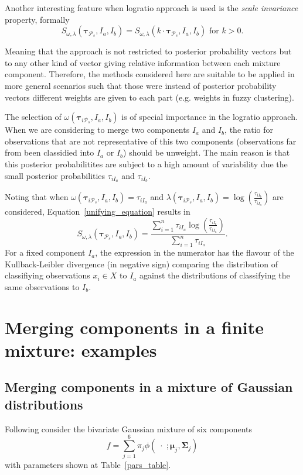 \documentclass[submit]{smj}
\theoremstyle{definition}
\newcommand{\m}[1]{\boldsymbol{#1}}
\begin{document}
Another interesting feature when logratio approach is used is the \emph{scale invariance} property, formally
\[
S_{\omega, \lambda}( \m\tau_{\mathcal{P}_s},  I_a,  I_b) = S_{\omega, \lambda}(k\cdot \m\tau_{\mathcal{P}_s},  I_a,  I_b) \text{ for $k>0$.}
\] 

Meaning that the approach is not restricted to posterior probability vectors but to any other kind of vector giving relative information between each mixture component. Therefore, the methods considered here are suitable to be applied in more general scenarios such that those were instead of posterior probability vectors different weights are given to each part (e.g. weights in fuzzy clustering).

The selection of $\omega(\m\tau_{i \mathcal{P}_s},  I_a,  I_b)$ is of special importance in the logratio approach. When we are considering to merge two components $I_a$ and $I_b$, the ratio for observations that are not representative of this two components (observations far from been classidied into $I_a$ or $I_b$) should be unweight. The main reason is that this posterior probabilitites are subject to a high amount of variability due the small posterior probabilities $\tau_{iI_a}$ and $\tau_{iI_b}$.

Noting that when $\omega(\m\tau_{i \mathcal{P}_s},  I_a,  I_b) =  \tau_{iI_a}$ and $\lambda(\m\tau_{i \mathcal{P}_s},  I_a,  I_b) = \log \left(\frac{ \tau_{iI_b} }{ \tau_{iI_a} }\right)$ are considered, Equation~\ref{unifying_equation} results in
\[
S_{\omega, \lambda}( \m\tau_{\mathcal{P}_s},  I_a,  I_b) = \frac{\sum_{i=1}^n\tau_{iI_a}  \log \left(\frac{ \tau_{iI_b} }{ \tau_{iI_a} }\right)}{\sum_{i=1}^n \tau_{iI_a}}.
\]
For a fixed component $I_a$, the expression in the numerator has the flavour of the Kullback-Leibler divergence (in negative sign) comparing the distribution of classifiying observations $x_i \in X$ to $I_a$ against the distributions of classifying the same observations to $I_b$.

\section{Merging components in a finite mixture: examples}\label{merging_examples_dist}

\subsection{Merging components in a mixture of Gaussian distributions}

Following \cite{baudry2010combining} consider the bivariate Gaussian mixture of six components
\[
f= \sum_{j=1}^6 \pi_j \phi(\;\cdot\; ;  \m\mu_j, \m\Sigma_j)
\]
with parameters shown at Table~\ref{pars_table}. 
\end{document}

